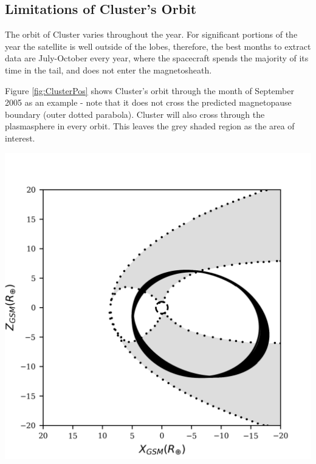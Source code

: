 \documentclass[12pt]{article}
\newenvironment{Figure}
  {\par\medskip\noindent\minipage{\linewidth}}
  {\endminipage\par\medskip}
\begin{document}
\subsection{Limitations of Cluster's Orbit}
The orbit of Cluster varies throughout the year. For significant portions of the year the satellite is well outside of the lobes, therefore, the best months to extract data are July-October every year, where the spacecraft spends the majority of its time in the tail, and does not enter the magnetosheath. 

Figure \ref{fig:ClusterPos} shows Cluster's orbit through the month of September 2005 as an example - note that it does not cross the predicted magnetopause boundary (outer dotted parabola). Cluster will also cross through the plasmasphere in every orbit. This leaves the grey shaded region as the area of interest.

\begin{Figure}
    \begin{minipage}[c]{0.4\textwidth}
        \centering
        \includegraphics[width=\textwidth]{sc_pos_09_05_coloured.png}
    \end{minipage}\hfill
    \begin{minipage}[c]{0.57\textwidth}
        \label{fig:ClusterPos}
    \end{minipage}
\end{Figure}
\end{document}
